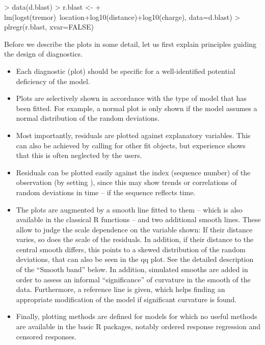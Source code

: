 \documentclass[11pt]{article}
\begin{document}
\begin{Schunk}
\begin{Sinput}
> data(d.blast)
> r.blast <- 
+   lm(logst(tremor)~location+log10(distance)+log10(charge), data=d.blast)
> plregr(r.blast, xvar=FALSE)
\end{Sinput}
\end{Schunk}
Before we describe the plots in some detail, let us first explain  
principles guiding the design of diagnostics.
\begin{itemize}
\item
Each diagnostic (plot) should be specific for a well-identified potential 
deficiency of the model.
\item
Plots are selectively shown in accordance with the type of model that has 
been fitted. For example, a normal plot is only shown if the model assumes
a normal distribution of the random deviations.
\item
Most importantly, residuals are plotted against explanatory variables.
This can also be achieved by calling  for other fit objects,  
but experience shows that this is often neglected by the users.
\item
Residuals can be plotted easily against the index (sequence number) 
of the observation (by setting ), 
since this may show trends or correlations of random deviations in time --
if the sequence reflects time.
\item
The plots are augmented by a smooth line fitted to them -- which is also
available in the classical R functions -- and two additional smooth lines.
These allow to judge the scale dependence on the variable shown:
If their distance varies, so does the scale of the residuals.
In addition, if their distance to the central smooth differs, this 
points to a skewed distribution of the random deviations, 
that can also be seen in the qq plot. See the detailed description 
of the ``Smooth band'' below. 
In addition, simulated smooths are added in order to assess an informal 
``significance'' of curvature in the smooth of the data. 
Furthermore, a reference line is given, which helps finding
an appropriate modification of the model if significant curvature is
found. 
\item
Finally, plotting methods are defined for models for which no useful 
methods are available in the basic R packages, notably ordered response
regression and censored responses.
\end{itemize}

\end{document}
